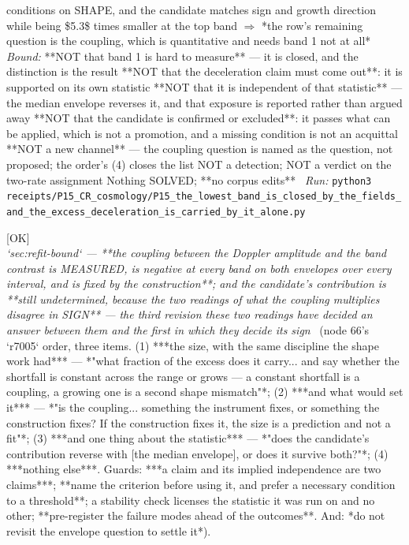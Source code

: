 \begin{description}
conditions on SHAPE, and the candidate matches sign and growth direction while being \$5.3\$ times smaller at the top band \ensuremath{\Rightarrow} *the row's remaining question is the coupling, which is quantitative and needs band 1 not at all*
 \emph{Bound:}  **NOT that band 1 is hard to measure** --- it is closed, and the distinction is the result  **NOT that the deceleration claim must come out**: it is supported on its own statistic  **NOT that it is independent of that statistic** --- the median envelope reverses it, and that exposure is reported rather than argued away  **NOT that the candidate is confirmed or excluded**: it passes what can be applied, which is not a promotion, and a missing condition is not an acquittal  **NOT a new channel** --- the coupling question is named as the question, not proposed; the order's (4) closes the list  NOT a detection; NOT a verdict on the two-rate assignment  Nothing SOLVED; **no corpus edits**
\ \emph{Run:} \texttt{python3 receipts/P15\_CR\_cosmology/P15\_the\_lowest\_band\_is\_closed\_by\_the\_fields\_and\_the\_excess\_deceleration\_is\_carried\_by\_it\_alone.py}
\item[\rcptlabel{P15_the_coupling_is_measured_and_negative_and_the_contribution_is_undetermined_because_its_input_is}{P15R202}\textbf{P15R202}\quad\texttt{P15\_the\_coupling\_is\_measured\_and\_negative\_and\_the\_contribution\_is\_undetermined\_because\_its\_input\_is}]\hfill\textsf{[OK]}\\
\textit{`sec:refit-bound` --- **the coupling between the Doppler amplitude and the band contrast is MEASURED, is negative at every band on both envelopes over every interval, and is fixed by the construction**; and the candidate's contribution is **still undetermined, because the two readings of what the coupling multiplies disagree in SIGN** --- the third revision these two readings have decided an answer between them and the first in which they decide its sign} \ (node 66's `r7005` order, three items. (1) ***the size, with the same discipline the shape work had*** --- *"what fraction of the excess does it carry... and say whether the shortfall is constant across the range or grows --- a constant shortfall is a coupling, a growing one is a second shape mismatch"*; (2) ***and what would set it*** --- *"is the coupling... something the instrument fixes, or something the construction fixes? If the construction fixes it, the size is a prediction and not a fit"*; (3) ***and one thing about the statistic*** --- *"does the candidate's contribution reverse with [the median envelope], or does it survive both?"*; (4) ***nothing else***.  Guards: ***a claim and its implied independence are two claims***; **name the criterion before using it, and prefer a necessary condition to a threshold**; a stability check licenses the statistic it was run on and no other; **pre-register the failure modes ahead of the outcomes**.  And: *do not revisit the envelope question to settle it*). 

\end{description}
